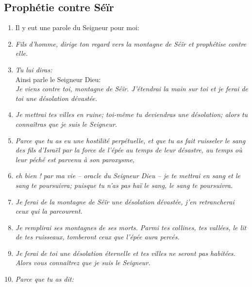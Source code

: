 \subsection*{Prophétie contre Séïr}
\begin{enumerate}[leftmargin=\psleftmargin, labelsep = \pslabelsep, label={\arabic*}, font=\color{\pscolor}\small\textsuperscript, parsep=0em, itemsep=0em, topsep=0em ]
  \item {}Il y eut une parole du Seigneur pour moi:
  \item {}\textit{Fils d’homme, dirige ton regard vers la montagne de Séïr \brk
          et prophétise contre elle.}
  \item {}\textit{Tu lui diras:} \\
        Ainsi parle le Seigneur Dieu: \\
        \textit{Je viens contre toi, montagne de Séïr.\brk
          J’étendrai la main sur toi \brk
          et je ferai de toi une désolation dévastée.}
  \item {}\textit{Je mettrai tes villes en ruine; \brk
          toi-même tu deviendras une désolation; \brk
          alors tu connaîtras que je suis le Seigneur.}
  \item {}\textit{Parce que tu as eu une hostilité perpétuelle, \brk
          et que tu as fait ruisseler le sang des fils d’Israël par la force de l’épée \brk
          au temps de leur désastre, \brk
          au temps où leur péché est parvenu à son paroxysme,}
  \item {}\textit{eh bien ! par ma vie – oracle du Seigneur Dieu – \brk
          je te mettrai en sang et le sang te poursuivra; \brk
          puisque tu n’as pas haï le sang, le sang te poursuivra.}
  \item {}\textit{Je ferai de la montagne de Séïr une désolation dévastée, \brk
          j’en retrancherai ceux qui la parcourent.}
  \item {}\textit{Je remplirai ses montagnes de ses morts. \brk
          Parmi tes collines, tes vallées, le lit de tes ruisseaux, \brk
          tomberont ceux que l’épée aura percés.}
  \item {}\textit{Je ferai de toi une désolation éternelle \brk
          et tes villes ne seront pas habitées. \brk
          Alors vous connaîtrez que je suis le Seigneur.} \verseSpace
  \item {}\textit{Parce que tu as dit:} \\

\end{enumerate}
